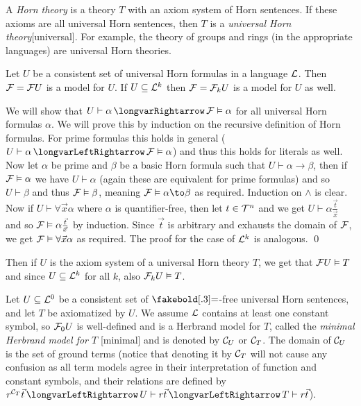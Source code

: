 A {\it Horn theory} is a theory $T$ with an axiom system of Horn sentences.
If these axioms are all universal Horn sentences, then $T$ is a {\it universal Horn theory}[universal].
For example, the theory of groups and rings (in the appropriate languages) are universal Horn theories.

\bthrm

    Let $U$ be a consistent set of universal Horn formulas in a language ${\cal L}$.
    Then ${\cal F}={\cal F}U$ is a model for $U$.
    If $U\subseteq{\cal L}^k$ then ${\cal F}={\cal F}_kU$ is a model for $U$ as well.

\ethrm

We will show that $U\vdash\alpha\implies{\cal F}\vDash\alpha$ for all universal Horn formulas $\alpha$.
We will prove this by induction on the recursive definition of Horn formulas.
For prime formulas this holds in general ($U\vdash\alpha\iff{\cal F}\vDash\alpha$) and thus this holds for literals as well.
Now let $\alpha$ be prime and $\beta$ be a basic Horn formula such that $U\vdash\alpha\to\beta$, then if ${\cal F}\vDash\alpha$ we have $U\vdash\alpha$ (again these are equivalent for prime formulas) and so
$U\vdash\beta$ and thus ${\cal F}\vDash\beta$, meaning ${\cal F}\vDash\alpha\to\beta$ as required.
Induction on $\land$ is clear.
Now if $U\vdash\forall\vec x\alpha$ where $\alpha$ is quantifier-free, then let $t\in{\cal T}^n$ and we get $U\vdash\alpha\frac{\vec t}{\vec x}$ and so ${\cal F}\vDash\alpha\frac{\vec t}{\vec x}$ by
induction.
Since $\vec t$ is arbitrary and exhausts the domain of ${\cal F}$, we get ${\cal F}\vDash\forall\vec x\alpha$ as required.
The proof for the case of ${\cal L}^k$ is analogous.
\qed

Then if $U$ is the axiom system of a universal Horn theory $T$, we get that ${\cal F}U\vDash T$ and since $U\subseteq{\cal L}^k$ for all $k$, also ${\cal F}_kU\vDash T$.

Let $U\subseteq{\cal L}^0$ be a consistent set of $\eq$-free universal Horn sentences, and let $T$ be axiomatized by $U$.
We assume ${\cal L}$ contains at least one constant symbol, so ${\cal F}_0U$ is well-defined and is a Herbrand model for $T$, called the {\it minimal Herbrand model for $T$}%
[minimal] and is denoted by ${\cal C}_U$ or ${\cal C}_T$.
The domain of ${\cal C}_U$ is the set of ground terms (notice that denoting it by ${\cal C}_T$ will not cause any confusion as all term models agree in their interpretation of function and constant symbols,
and their relations are defined by $r^{{\cal C}_T}\vec t\iff U\vdash r\vec t\iff T\vdash r\vec t$).

